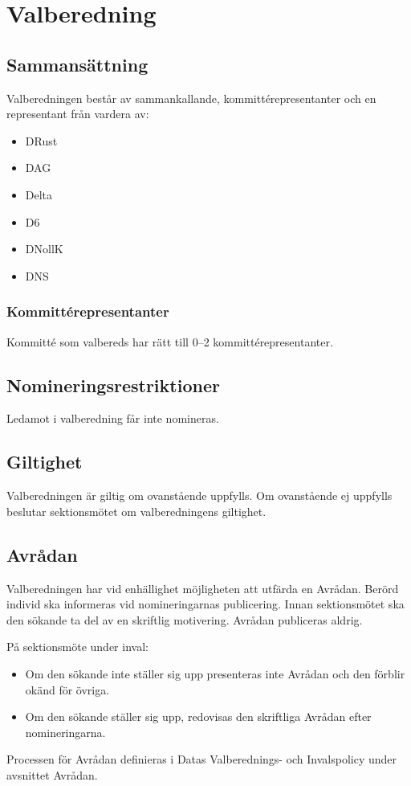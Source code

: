\section{Valberedning}
\subsection{Sammansättning}
Valberedningen består av sammankallande, kommittérepresentanter och
en representant från vardera av:
\begin{itemize}
  \item DRust
  \item DAG 
  \item Delta 
  \item D6 
  \item DNollK
  \item DNS
\end{itemize}
\subsubsection{Kommittérepresentanter}
Kommitté som valbereds har rätt till 0–2 kommittérepresentanter.
\subsection{Nomineringsrestriktioner}
Ledamot i valberedning får inte nomineras.
\subsection{Giltighet}
Valberedningen är giltig om ovanstående uppfylls. Om ovanstående ej uppfylls 
beslutar sektionsmötet om valberedningens giltighet.
\subsection{Avrådan}
Valberedningen har vid enhällighet möjligheten att utfärda en Avrådan.
Berörd individ ska informeras vid nomineringarnas publicering.
Innan sektionsmötet ska den sökande ta del av en skriftlig motivering.
Avrådan publiceras aldrig.

På sektionsmöte under inval:
\begin{itemize}
  \item Om den sökande inte ställer sig upp presenteras inte Avrådan och den förblir okänd för övriga.
  \item Om den sökande ställer sig upp, redovisas den skriftliga Avrådan efter nomineringarna.
\end{itemize}
Processen för Avrådan definieras i Datas Valberednings- och Invalspolicy under avsnittet Avrådan.
\newpage
